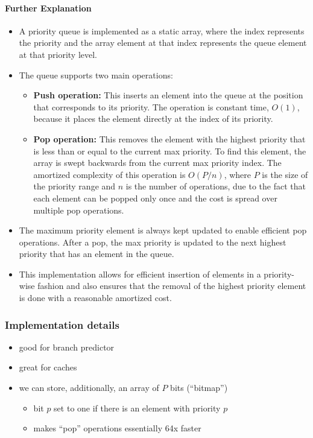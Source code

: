 \documentclass[12pt]{article}
\begin{document}
\paragraph{Further Explanation}
\begin{itemize}
    \item A priority queue is implemented as a static array, where the index represents the priority and the array element at that index represents the queue element at that priority level.
    \item The queue supports two main operations:
    \begin{itemize}
        \item \textbf{Push operation:} This inserts an element into the queue at the position that corresponds to its priority. The operation is constant time, \( O(1) \), because it places the element directly at the index of its priority.
        \item \textbf{Pop operation:} This removes the element with the highest priority that is less than or equal to the current max priority. To find this element, the array is swept backwards from the current max priority index. The amortized complexity of this operation is \( O(P / n) \), where \( P \) is the size of the priority range and \( n \) is the number of operations, due to the fact that each element can be popped only once and the cost is spread over multiple pop operations.
    \end{itemize}
    \item The maximum priority element is always kept updated to enable efficient pop operations. After a pop, the max priority is updated to the next highest priority that has an element in the queue.
    \item This implementation allows for efficient insertion of elements in a priority-wise fashion and also ensures that the removal of the highest priority element is done with a reasonable amortized cost.
\end{itemize}

\subsubsection{Implementation details}

\begin{itemize}
  \item good for branch predictor
  \item great for caches
  \item we can store, additionally, an array of $P$ bits (``bitmap'')
  \begin{itemize}
    \item bit $p$ set to one if there is an element with priority $p$
    \item makes ``pop'' operations essentially 64x faster
  \end{itemize}
\end{itemize}
\end{document}
